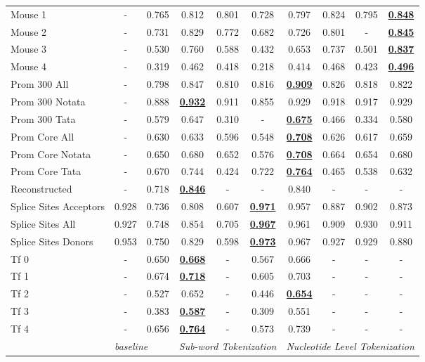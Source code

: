 \begin{table*}[h!]
\begin{center}
\begin{tabular}{l|cc|ccc|cccc}
Mouse 1 & - & 0.765 & 0.812 & 0.801 & 0.728 & 0.797 & 0.824 & 0.795 & {\ul \textbf{0.848}} \\
Mouse 2 & - & 0.731 & 0.829 & 0.772 & 0.682 & 0.726 & 0.801 & - & {\ul \textbf{0.845}} \\
Mouse 3 & - & 0.530 & 0.760 & 0.588 & 0.432 & 0.653 & 0.737 & 0.501 & {\ul \textbf{0.837}} \\
Mouse 4 & - & 0.319 & 0.462 & 0.418 & 0.218 & 0.414 & 0.468 & 0.423 & {\ul \textbf{0.496}} \\
Prom 300 All & - & 0.798 & 0.847 & 0.810 & 0.816 & {\ul \textbf{0.909}} & 0.826 & 0.818 & 0.822 \\
Prom 300 Notata & - & 0.888 & {\ul \textbf{0.932}} & 0.911 & 0.855 & 0.929 & 0.918 & 0.917 & 0.929 \\
Prom 300 Tata & - & 0.579 & 0.647 & 0.310 & - & {\ul \textbf{0.675}} & 0.466 & 0.334 & 0.580 \\
Prom Core All & - & 0.630 & 0.633 & 0.596 & 0.548 & {\ul \textbf{0.708}} & 0.626 & 0.617 & 0.659 \\
Prom Core Notata & - & 0.650 & 0.680 & 0.652 & 0.576 & {\ul \textbf{0.708}} & 0.664 & 0.654 & 0.680 \\
Prom Core Tata & - & 0.670 & 0.744 & 0.424 & 0.722 & {\ul \textbf{0.764}} & 0.465 & 0.538 & 0.632 \\
Reconstructed & - & 0.718 & {\ul \textbf{0.846}} & - & - & 0.840 & - & - & - \\
Splice Sites Acceptors & 0.928 & 0.736 & 0.808 & 0.607 & {\ul \textbf{0.971}} & 0.957 & 0.887 & 0.902 & 0.873 \\
Splice Sites All & 0.927 & 0.748 & 0.854 & 0.705 & {\ul \textbf{0.967}} & 0.961 & 0.909 & 0.930 & 0.911 \\
Splice Sites Donors & 0.953 & 0.750 & 0.829 & 0.598 & {\ul \textbf{0.973}} & 0.967 & 0.927 & 0.929 & 0.880 \\
Tf 0 & - & 0.650 & {\ul \textbf{0.668}} & - & 0.567 & 0.666 & - & - & - \\
Tf 1 & - & 0.674 & {\ul \textbf{0.718}} & - & 0.605 & 0.703 & - & - & - \\
Tf 2 & - & 0.527 & 0.652 & - & 0.446 & {\ul \textbf{0.654}} & - & - & - \\
Tf 3 & - & 0.383 & {\ul \textbf{0.587}} & - & 0.309 & 0.551 & - & - & - \\
Tf 4 & - & 0.656 & {\ul \textbf{0.764}} & - & 0.573 & 0.739 & - & - & - \\
\hline
 & \multicolumn{2}{l|}{\textit{baseline}} & \multicolumn{3}{c|}{\textit{Sub-word Tokenization}} & \multicolumn{4}{c}{\textit{Nucleotide Level Tokenization}} \\ \hline

\end{tabular}
\end{center}
\end{table*}

